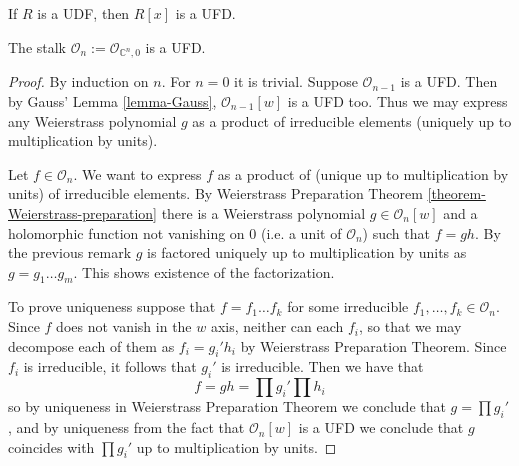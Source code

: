 \begin{lemma}
\label{lemma-Gauss-UFD}
If $R$ is a UDF, then $R[x]$ is a UFD.
\end{lemma}

\begin{lemma}
\label{lemma-stalk-is-UFD}
The stalk $\mathcal{O}_n:=\mathcal{O}_{\mathbb{C}^n,0}$ is a UFD.
\end{lemma}

\begin{proof}
By induction on $n$. For $n=0$ it is trivial. Suppose $\mathcal{O}_{n-1}$ is a
UFD. Then by Gauss' Lemma \ref{lemma-Gauss}, $\mathcal{O}_{n-1}[w]$ is a UFD
too. Thus we may express any Weierstrass polynomial $g$ as a product of
irreducible elements (uniquely up to multiplication by units).

Let $f\in \mathcal{O}_n$. We want to express $f$ as a product of (unique up to
multiplication by units) of irreducible elements. By Weierstrass Preparation
Theorem \ref{theorem-Weierstrass-preparation} there is a Weierstrass polynomial
$g\in\mathcal{O}_n[w]$ and a holomorphic function not vanishing on $0$ (i.e. a
unit of $\mathcal{O}_n$) such that $f=gh$. By the previous remark $g$ is
factored uniquely up to multiplication by units as $g=g_1\ldots g_m$. This shows
existence of the factorization.

To prove uniqueness suppose that $f=f_1\ldots f_k$ for some irreducible
$f_1,\ldots,f_k\in\mathcal{O}_n$. Since $f$ does not vanish in the $w$ axis,
neither can each $f_i$, so that we may decompose each of them as  $f_i=g_i'h_i$
by Weierstrass Preparation Theorem. Since $f_i$ is irreducible, it follows that
$g_i'$ is irreducible. Then we have that $$ f=gh=\prod g_i'\prod h_i $$ so by
uniqueness in Weierstrass Preparation Theorem we conclude that $g=\prod g_i'$,
and by uniqueness from the fact that  $\mathcal{O}_n[w]$ is a UFD we conclude
that $g$ coincides with $\prod g_i'$ up to multiplication by units.
\end{proof}





